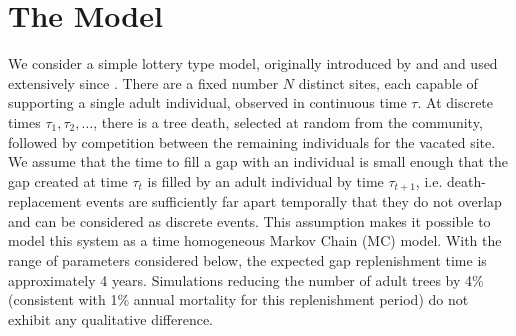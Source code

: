 \documentclass[a4paper]{article}
\begin{document}
\section{The Model}
\label{model}
We consider a simple lottery type model, originally introduced by \cite{sale1978coexistence} and \cite{chesson1981environmental} and used extensively since \citep[e.g.][]{muko2000species,pacala1992herbivores}. There are a fixed number $N$ distinct sites, each capable of supporting a single adult individual, observed in continuous time $\tau$. At discrete times $\tau_1,\tau_2, \dots$, there is a tree death, selected at random from the community, followed by competition between the remaining individuals for the vacated site. We assume that the time to fill a gap with an individual is small enough that the gap created at time $\tau_t$ is filled by an adult individual by time $\tau_{t+1}$, i.e. death-replacement events are sufficiently far apart temporally that they do not overlap and can be considered as discrete events. This assumption makes it possible to model this system as a time homogeneous Markov Chain (MC) model. With the range of parameters considered below, the expected gap replenishment time is approximately 4 years. Simulations reducing the number of adult trees by 4\% (consistent with 1\% annual mortality for this replenishment period) do not exhibit any qualitative difference.
\end{document}
